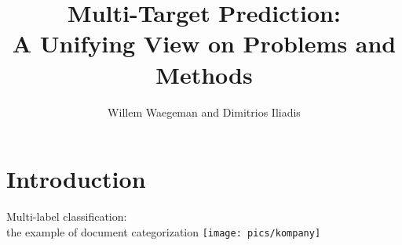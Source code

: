 \documentclass[]{beamer}
\title[]{Multi-Target Prediction:\\ 
A Unifying View on Problems and Methods}
\author[Willem Waegeman]{Willem Waegeman and Dimitrios Iliadis}
\institute[VFU] %
{
  \inst{}
Department of Data Analysis and Mathematical Modelling, Ghent University, Belgium
}
\begin{document}
\frame{\titlepage}


\section{Introduction}

		
		\begin{frame}[plain]
     \end{frame}



\begin{frame}{Multi-label classification: \\
the example of document categorization}
\texttt{[image: pics/kompany]}
\end{frame}
\end{document}

